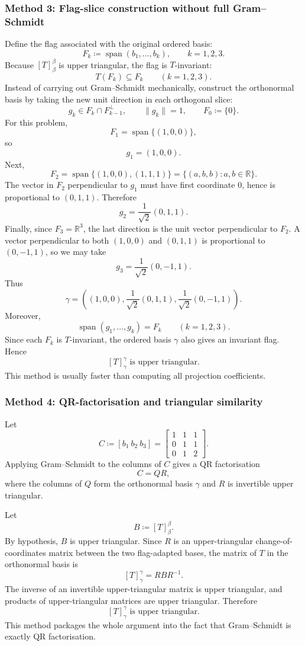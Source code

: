 \documentclass[12pt]{article}
\newcommand{\df}{\coloneqq}
\newcommand{\R}{\mathbb{R}}
\DeclareMathOperator{\Span}{span}
\begin{document}
\subsubsection{Method 3: Flag-slice construction without full Gram--Schmidt}
Define the flag associated with the original ordered basis:
\[
F_k\df \Span(b_1,\dots,b_k),\qquad k=1,2,3.
\]
Because $[T]_{\beta}^{\beta}$ is upper triangular, the flag is $T$-invariant:
\[
T(F_k)\subseteq F_k\qquad (k=1,2,3).
\]
Instead of carrying out Gram--Schmidt mechanically, construct the orthonormal basis by taking the new unit direction in each orthogonal slice:
\[
g_k\in F_k\cap F_{k-1}^{\perp},
\qquad \|g_k\|=1,
\qquad F_0\df\{0\}.
\]
For this problem,
\[
F_1=\Span\{(1,0,0)\},
\]
so
\[
g_1=(1,0,0).
\]
Next,
\[
F_2=\Span\{(1,0,0),(1,1,1)\}=\{(a,b,b):a,b\in\R\}.
\]
The vector in $F_2$ perpendicular to $g_1$ must have first coordinate $0$, hence is proportional to $(0,1,1)$. Therefore
\[
g_2=\frac{1}{\sqrt2}(0,1,1).
\]
Finally, since $F_3=\R^3$, the last direction is the unit vector perpendicular to $F_2$. A vector perpendicular to both $(1,0,0)$ and $(0,1,1)$ is proportional to $(0,-1,1)$, so we may take
\[
g_3=\frac{1}{\sqrt2}(0,-1,1).
\]
Thus
\[
\boxed{\,
\gamma=\left((1,0,0),\frac{1}{\sqrt2}(0,1,1),\frac{1}{\sqrt2}(0,-1,1)\right).
\,}
\]
Moreover,
\[
\Span(g_1,\dots,g_k)=F_k\qquad(k=1,2,3).
\]
Since each $F_k$ is $T$-invariant, the ordered basis $\gamma$ also gives an invariant flag. Hence
\[
\boxed{\,[T]_{\gamma}^{\gamma}\text{ is upper triangular.}\,}
\]
This method is usually faster than computing all projection coefficients.

\subsubsection{Method 4: QR-factorisation and triangular similarity}
Let
\[
C\df [b_1\ b_2\ b_3]
=\begin{bmatrix}
1&1&1\\
0&1&1\\
0&1&2
\end{bmatrix}.
\]
Applying Gram--Schmidt to the columns of $C$ gives a QR factorisation
\[
C=QR,
\]
where the columns of $Q$ form the orthonormal basis $\gamma$ and $R$ is invertible upper triangular.

Let
\[
B\df [T]_{\beta}^{\beta}.
\]
By hypothesis, $B$ is upper triangular. Since $R$ is an upper-triangular change-of-coordinates matrix between the two flag-adapted bases, the matrix of $T$ in the orthonormal basis is
\[
[T]_{\gamma}^{\gamma}=RBR^{-1}.
\]
The inverse of an invertible upper-triangular matrix is upper triangular, and products of upper-triangular matrices are upper triangular. Therefore
\[
\boxed{\,[T]_{\gamma}^{\gamma}\text{ is upper triangular.}\,}
\]
This method packages the whole argument into the fact that Gram--Schmidt is exactly QR factorisation.
\end{document}
